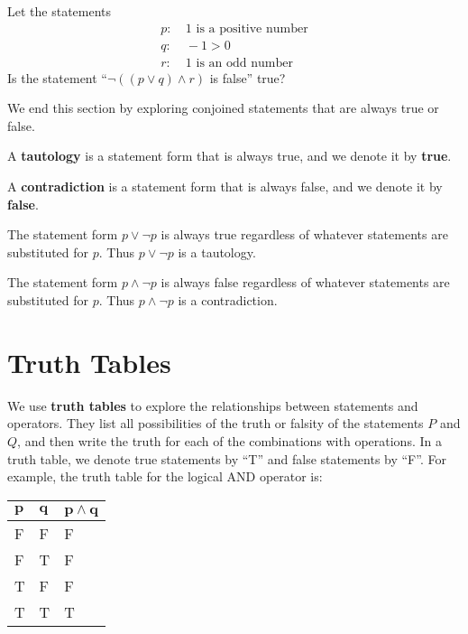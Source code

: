\begin{exercise}
    Let the statements
    \begin{align*}
        p: &\ \text{1 is a positive number}\\
        q: &\ -1 > 0\\
        r: &\ \text{1 is an odd number}
    \end{align*}
    Is the statement ``$\lnot((p\lor q)\land r)$ is false'' true?
\end{exercise}

We end this section by exploring conjoined statements that are always true or false.

\begin{definition}
    A \textbf{tautology} is a statement form that is always true, and we denote it by \textbf{true}.
\end{definition}
\begin{definition}
    A \textbf{contradiction} is a statement form that is always false, and we denote it by \textbf{false}.
\end{definition}
\begin{example}
    The statement form $p \lor \lnot p$ is always true regardless of whatever statements are substituted for $p$. Thus $p \lor \lnot p$ is a tautology.
\end{example}
\begin{example}
    The statement form $p \land \lnot p$ is always false regardless of whatever statements are substituted for $p$. Thus $p \land \lnot p$ is a contradiction.
\end{example}

\section{Truth Tables}
We use \textbf{truth tables} to explore the relationships between statements and operators. They list all possibilities of the truth or falsity of the statements $P$ and $Q$, and then write the truth for each of the combinations with operations. In a truth table, we denote true statements by ``T'' and false statements by ``F''. For example, the truth table for the logical AND operator is:
\begin{table}[h]
    \centering
    \begin{tabular}{|l|l||l|}
        \hline
        $\boldsymbol{p}$ & $\boldsymbol{q}$ & $\boldsymbol{p \land q}$ \\ \hline
        F   & F   & F          \\ \hline
        F   & T   & F          \\ \hline
        T   & F   & F          \\ \hline
        T   & T   & T          \\ \hline
    \end{tabular}
\end{table}


